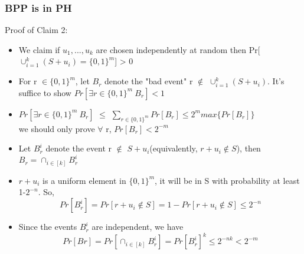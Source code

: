 \documentclass{beamer}
\begin{document}
\begin{frame}
\frametitle{BPP is in PH}
{\color{red} Proof of Claim 2}: 
\begin{itemize}
	\item We claim if $u_{1},...,u_{k}$ are chosen independently at random then Pr[$\cup_{i=1}^{k}(S+u_{i}) = \{0, 1\}^{m}$] > 0 
	\item For r $\in \{0, 1\}^{m}$, let $B_{r}$ denote the "bad event" r $\notin$ $\cup_{i=1}^{k}(S+u_{i})$. It's suffice to show $Pr[\exists r \in \{0, 1\}^{m}\ B_{r}] < 1$
	\item $Pr[\exists r \in \{0, 1\}^{m}\ B_{r}]$ $\leq$ $\sum_{r \in \{0, 1\}^{m}}Pr[B_{r}] \leq 2^{m}max\{Pr[B_{r}]\}$\\
	we should only prove $\forall$ r, $Pr[B_{r}] < 2^{-m}$
	\item Let $B_{r}^{i}$ denote the event r $\notin$ $S+u_{i}$(equivalently, $r+u_{i} \notin S$), then $B_{r} = \cap_{i \in [k]} B_{r}^{i}$\\
	\item $r+u_{i}$ is a uniform element in $\{0,1\}^{m}$, it will be in  S with probability at least 1-$2^{-n}$. So, 
	$$
	Pr[B_{r}^{i}] = Pr[r+u_{i} \notin S] = 1-Pr[r+u_{i} \notin S] \leq 2^{-n}
	$$ 
	\item Since the events $B_{r}^{i}$ are independent, we have
	$$Pr[Br] = Pr[\cap_{i \in [k]} B_{r}^{i}] = Pr[B_{r}^{i}]^{k} \leq 2^{-nk} < 2^{-m}$$ 
\end{itemize}
\end{frame}
\end{document}
